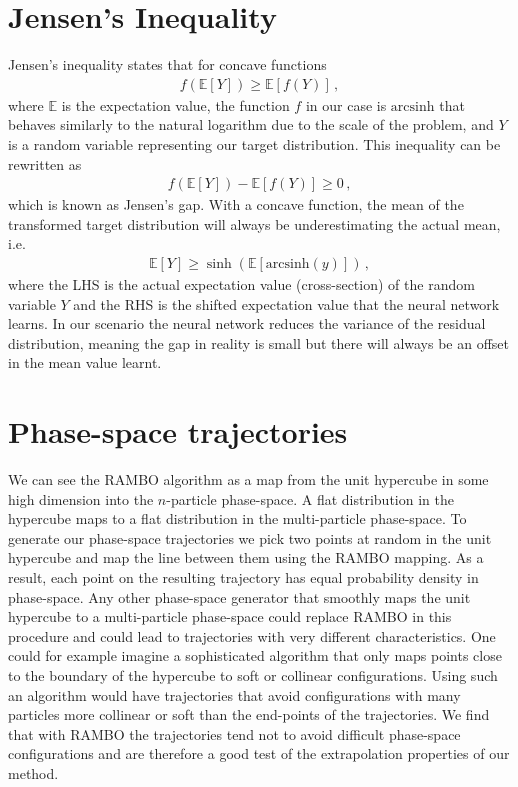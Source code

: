 \documentclass[main.tex]{subfiles}
\begin{document}
\section{Jensen's Inequality}\label{appendix:fame1_jensen}
Jensen's inequality states that for concave functions
\begin{eqnarray}
    f(\mathbb{E}[Y]) \geq \mathbb{E}[f(Y)] \, ,
\end{eqnarray}
where $\mathbb{E}$ is the expectation value, the function $f$ in our case is $\mathrm{arcsinh}$ that behaves similarly to the natural logarithm due to the scale of the problem, and $Y$ is a random variable representing our target distribution.
This inequality can be rewritten as
\begin{eqnarray}
    f(\mathbb{E}[Y]) - \mathbb{E}[f(Y)] \geq 0 \, ,
\end{eqnarray}
which is known as Jensen's gap.
With a concave function, the mean of the transformed target distribution will always be underestimating the actual mean, i.e.
\begin{eqnarray}
    \mathbb{E}[Y] \geq \sinh{(\mathbb{E}[\mathrm{arcsinh}{(y)}])} \, ,
\end{eqnarray}
where the LHS is the actual expectation value (cross-section) of the random variable $Y$ and the RHS is the shifted expectation value that the neural network learns.
In our scenario the neural network reduces the variance of the residual distribution, meaning the gap in reality is small but there will always be an offset in the mean value learnt.

\section{Phase-space trajectories}\label{appendix:fame1_trajectory_generation}
We can see the RAMBO algorithm as a map from the unit hypercube in some high dimension into the $n$-particle phase-space. A flat distribution in the hypercube maps to a flat distribution in the multi-particle phase-space. 
To generate our phase-space trajectories we pick two points at random in the unit hypercube and map the line between them using the RAMBO mapping. As a result, each point on the resulting trajectory has equal probability density in phase-space. 
Any other phase-space generator that smoothly maps the unit hypercube to a multi-particle phase-space could replace RAMBO in this procedure and could lead to trajectories with very different characteristics. One could for example imagine a 
sophisticated algorithm that only maps points close to the boundary of the hypercube to soft or collinear configurations. Using such an algorithm would have trajectories that avoid configurations with many particles more collinear or soft than 
the end-points of the trajectories. We find that with RAMBO the trajectories tend not to avoid difficult phase-space configurations and are therefore a good test of the extrapolation properties of our method.
\end{document}
